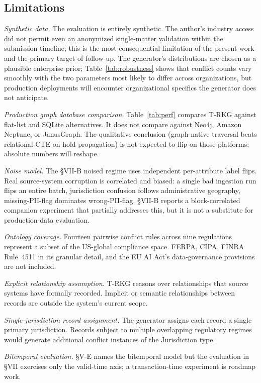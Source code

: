 \documentclass{ieeeaccess}
\begin{document}
\subsection{Limitations}

\textit{Synthetic data.} The evaluation is entirely synthetic. The author's industry access did not permit even an anonymized single-matter validation within the submission timeline; this is the most consequential limitation of the present work and the primary target of follow-up. The generator's distributions are chosen as a plausible enterprise prior; Table~\ref{tab:robustness} shows that conflict counts vary smoothly with the two parameters most likely to differ across organizations, but production deployments will encounter organizational specifics the generator does not anticipate.

\textit{Production graph database comparison.} Table~\ref{tab:perf} compares T-RKG against flat-list and SQLite alternatives. It does not compare against Neo4j, Amazon Neptune, or JanusGraph. The qualitative conclusion (graph-native traversal beats relational-CTE on hold propagation) is not expected to flip on those platforms; absolute numbers will reshape.

\textit{Noise model.} The §VII-B noised regime uses independent per-attribute label flips. Real source-system corruption is correlated and biased: a single bad ingestion run flips an entire batch, jurisdiction confusion follows administrative geography, missing-PII-flag dominates wrong-PII-flag. §VII-B reports a block-correlated companion experiment that partially addresses this, but it is not a substitute for production-data evaluation.

\textit{Ontology coverage.} Fourteen pairwise conflict rules across nine regulations represent a subset of the US-global compliance space. FERPA, CIPA, FINRA Rule~4511 in its granular detail, and the EU AI Act's data-governance provisions are not included.

\textit{Explicit relationship assumption.} T-RKG reasons over relationships that source systems have formally recorded. Implicit or semantic relationships between records are outside the system's current scope.

\textit{Single-jurisdiction record assignment.} The generator assigns each record a single primary jurisdiction. Records subject to multiple overlapping regulatory regimes would generate additional conflict instances of the Jurisdiction type.

\textit{Bitemporal evaluation.} §V-E names the bitemporal model but the evaluation in §VII exercises only the valid-time axis; a transaction-time experiment is roadmap work.
\end{document}
